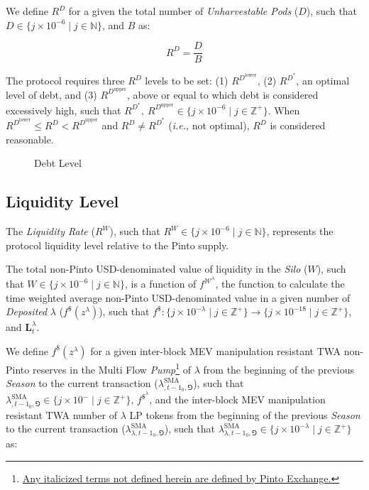 \documentclass[tikz]{article}
\newcommand{\term}[1]{\textsl{#1}}
\newcommand{\fref}[1]{\footnote{\href{http://#1}{#1}}}
\newcommand{\nonpinto}{} %
\begin{document}
We define $R^{D}$ for a given the total number of \term{Unharvestable Pods} ($D$), such that $D \in \{j \times 10^{-6} \mid j \in \mathbb{N} \}$, and $B$ as:

    $$
        R^{D} = \frac{D}{B}
    $$

\newpage

The protocol requires three $R^{D}$ levels to be set: (1) $R^{D^{\text{lower}}}$, (2) $R^{D^{*}}$, an optimal level of debt, and (3) $R^{D^{\text{upper}}}$, above or equal to which debt is considered excessively high, such that $R^{D^{*}},\ R^{D^{\text{upper}}} \in \{j \times 10^{-6} \mid j \in \mathbb{Z}^{+} \}$. When $R^{D^{\text{lower}}} \leq R^{D} < R^{D^{\text{upper}}}$ and $R^{D} \neq R^{D^{*}}$ (\textit{i.e.}, not optimal), $R^{D}$ is considered reasonable.


\begin{figure}[h!]
    \centering
    
    \vspace*{-7mm}
    \setlength{\belowcaptionskip}{-8pt} %
    \caption{Debt Level}
    \label{Debt Level}
\end{figure}


\subsection{Liquidity Level}

The \term{Liquidity Rate} ($R^{W}$), such that $R^{W} \in \{j \times 10^{-6} \mid j \in \mathbb{N} \}$, represents the protocol liquidity level relative to the Pinto supply.

The total non-Pinto USD-denominated value of liquidity in the \term{Silo} ($W$), such that $W \in \{j \times 10^{-6} \mid j \in \mathbb{N} \}$, is a function of $f^{\mathscr{W}^{\lambda}}$, the function to calculate the time weighted average non-Pinto USD-denominated value in a given number of \term{Deposited} $\lambda$ ($f^{\$}(z^{\lambda})$), such that $f^{\$}\colon \{j \times 10^{-\lambda} \mid j \in \mathbb{Z}^{+} \} \rightarrow \{j \times 10^{-18} \mid j \in \mathbb{Z}^{+} \}$, and $\mathbf{L}_{t}^{\lambda}$.

We define $f^{\$}(z^{\lambda})$ for a given inter-block MEV manipulation resistant TWA non-Pinto reserves in the Multi Flow \term{Pump}\fref{Any italicized terms not defined herein are defined by Pinto Exchange.} of $\lambda$ from the beginning of the previous \term{Season} to the current transaction ($\lambda_{\nonpinto,{t-1}_0,\Game}^{\text{SMA}}$), such that $\lambda_{\nonpinto,{t-1}_0,\Game}^{\text{SMA}} \in \{j \times 10^{-\nonpinto} \mid j \in \mathbb{Z}^{+} \}$, $f^{\$^{\lambda}}$, and the inter-block MEV manipulation resistant TWA number of $\lambda$ LP tokens from the beginning of the previous \term{Season} to the current transaction ($\lambda_{\lambda,{t-1}_0,\Game}^{\text{SMA}}$), such that $\lambda_{\lambda,{t-1}_0,\Game}^{\text{SMA}} \in \{j \times 10^{-\lambda} \mid j \in \mathbb{Z}^{+} \}$ as:
\end{document}
